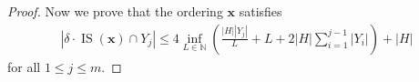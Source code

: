 \documentclass[11pt]{amsart}
\theoremstyle{definition}
\newcommand{\bx}{\mathbf{x}}
\DeclareMathOperator{\IS}{IS}
\begin{document}
\begin{proof}




Now we prove that the ordering $\bx$ satisfies
\begin{align*}
|\delta\cdot\IS(\bx) \cap Y_j| \leq 4\inf_{L \in \mathbb{N}} \left(\frac{|H| |Y_j|}{L}+L+2|H|\sum_{i=1}^{j-1}|Y_i|\right) + |H|\end{align*}
for all $1 \leq j \leq m$.


\end{proof}
\end{document}
